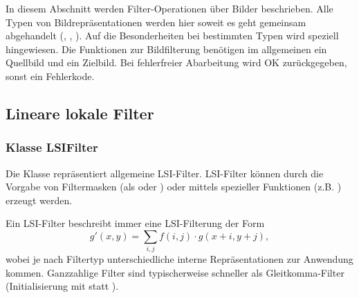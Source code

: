 
In diesem Abschnitt werden Filter-Operationen über Bilder beschrieben.
Alle Typen von Bildrepräsentationen werden hier soweit es geht gemeinsam 
abgehandelt (, , ). 
Auf die Besonderheiten bei bestimmten Typen wird speziell hingewiesen. 
Die Funktionen zur Bildfilterung benötigen im allgemeinen ein Quellbild
und ein Zielbild. Bei fehlerfreier Abarbeitung wird OK zurückgegeben, sonst
ein Fehlerkode.

\subsection{Lineare lokale Filter}
\hypertarget{LSIFilter}{}
\subsubsection{Klasse LSIFilter}
Die Klasse  repräsentiert allgemeine LSI-Filter. 
LSI-Filter können durch die Vorgabe von Filtermasken 
(als  oder ) oder mittels spezieller 
Funktionen (z.B. ) erzeugt werden.

Ein LSI-Filter beschreibt immer eine LSI-Filterung der Form 
\[ g \prime (x,y) = \sum_{i,j} f(i,j) \cdot g(x+i,y+j) ,\]
wobei je nach Filtertyp unterschiedliche interne Repräsentationen 
zur Anwendung kommen. Ganzzahlige Filter sind typischerweise 
schneller als Gleitkomma-Filter (Initialisierung mit  
statt ).
 
\subtitle{Konstruktoren}




